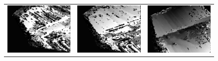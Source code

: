 \documentclass[11pt]{report}
\begin{document}
\begin{figure}[H]
\begin{tabular}{ccc}
    \includegraphics[scale=0.1]{images/disparity-opencv-t/disparity_16.png} &
    \includegraphics[scale=0.1]{images/disparity-opencv-d/disparity_16.png} &
    \includegraphics[scale=0.1]{images/disparity-opengv/disparity_16.png} \\

\end{tabular}
\end{figure}
\end{document}
